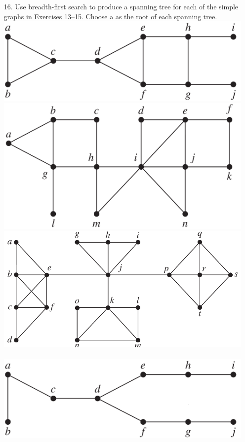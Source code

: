 \begin{itemize}
\item[16.]  Use breadth-first search to produce a spanning tree for
each of the simple graphs in Exercises 13–15. Choose a
as the root of each spanning tree. \\
\includegraphics[scale = 0.25]{img/11_4_13_graph.png} \quad
\includegraphics[scale = 0.25]{img/11_4_14_graph.png} \vspace{2mm}\\
\includegraphics[scale = 0.5]{img/11_4_15_graph.png} \vspace{1.5mm}\\
\answer \\
\includegraphics[scale = 0.25]{img/11_4_13_tree.png} \quad

\end{itemize}
